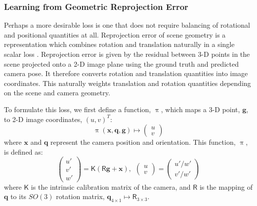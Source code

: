 \subsubsection{Learning from Geometric Reprojection Error}
\label{sec:reproj}

Perhaps a more desirable loss is one that does not require balancing of rotational and positional quantities at all. Reprojection error of scene geometry is a representation which combines rotation and translation naturally in a single scalar loss \citep{hartley2000}. Reprojection error is given by the residual between 3-D points in the scene projected onto a 2-D image plane using the ground truth and predicted camera pose. It therefore converts rotation and translation quantities into image coordinates. This naturally weights translation and rotation quantities depending on the scene and camera geometry.

To formulate this loss, we first define a function, $\uppi$, which maps a 3-D point, $\mathbf{g}$, to 2-D image coordinates, $(u,v)^T$:
\begin{equation}
\uppi (\mathbf{x},\mathbf{q},\mathbf{g}) \mapsto \begin{pmatrix} u \\ v \end{pmatrix}
\end{equation}
where $\mathbf{x}$ and $\mathbf{q}$ represent the camera position and orientation. This function, $\uppi$, is defined as:
\begin{equation}
\begin{pmatrix} u' \\ v' \\ w' \end{pmatrix} = \mathsf{K} ( \mathsf{R} \mathbf{g} + \mathbf{x}), 
~~\begin{pmatrix} u \\ v \end{pmatrix} = \begin{pmatrix} u'/w' \\ v'/w' \end{pmatrix}
\end{equation}
where $\mathsf{K}$ is the intrinsic calibration matrix of the camera, and $\mathsf{R}$ is the mapping of $\mathbf{q}$ to its $SO(3)$ rotation matrix, $\textbf{q}_{4\times1} \mapsto \mathsf{R}_{3\times3}$.

